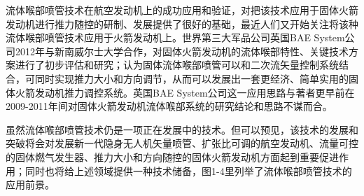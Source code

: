 流体喉部喷管技术在航空发动机上的成功应用和验证，对把该技术应用于固体火箭发动机进行推力随控的研制、发展提供了很好的基础，最近人们又开始关注将该种流体喉部喷管技术应用于火箭发动机上。世界第三大军品公司英国BAE System公司2012年与新南威尔士大学合作，对固体火箭发动机的流体喉部特性、关键技术方案进行了初步评估和研究；认为固体流体喉部喷管可以和二次流矢量控制系统结合，可同时实现推力大小和方向调节，从而可以发展出一套更经济、简单实用的固体火箭发动机推力调控系统。英国BAE System公司这一应用思路与著者更早前在2009-2011年间对固体火箭发动机流体喉部系统的研究结论和思路不谋而合。

虽然流体喉部喷管技术仍是一项正在发展中的技术。但可以预见，该技术的发展和突破将会对发展新一代隐身无人机矢量喷管、扩张比可调的航空发动机、流量可控的固体燃气发生器、推力大小和方向随控的固体火箭发动机方面起到重要促进作用；同时也将给上述领域提供一种技术储备，图1-4里列举了流体喉部喷管技术的应用前景。

